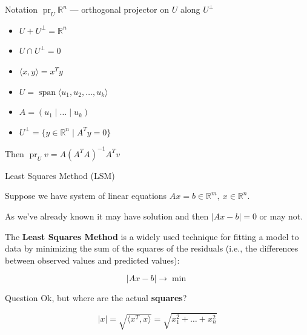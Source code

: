 \documentclass[fullscreen=true, bookmarks=true, hyperref={pdfencoding=unicode}]{beamer}
\begin{document}
\begin{frame}
  \begin{block}{Notation}
    $\operatorname{pr}_U \mathbb{R}^n$ — orthogonal projector 
    on $U$ along $U^\perp$
  \end{block}
  \pause\vspace{0.5cm}
  \begin{itemize}
    \item $U + U^\perp = \mathbb{R}^n$
    \item $U \cap U^\perp = 0$
    \pause
    \item $\langle x, y\rangle = x^T y$
    \item $U = \operatorname{span}\langle u_1, u_2, \dots, u_k\rangle$
    \item $A = (u_1 \mid \dots \mid u_k)$
    \item $U^\perp = \{y \in \mathbb{R}^n \mid A^Ty = 0\}$
  \end{itemize}

  \vspace{0.5cm}
  Then $\operatorname{pr}_U v = A \left(A^TA \right)^{-1}A^Tv$
\end{frame}


\begin{frame}{Least Squares Method (LSM)}

  Suppose we have system of linear equations $Ax=b \in \mathbb{R}^m,\ x \in \mathbb{R}^n$.

  \pause
  As we've already known it may have solution and then $|Ax-b| = 0$ or may not.

  \pause
  The \textbf{Least Squares Method} is a widely used technique 
  for fitting a model to data by minimizing the sum of the squares 
  of the residuals (i.e., the differences between observed values 
  and predicted values):

  $$|Ax-b| \to \min$$

  \pause
  \begin{block}{Question}
    Ok, but where are the actual \textbf{squares}?
  \end{block}

  \pause
  $$|x| = \sqrt{\langle x^T, x\rangle} = \sqrt{x_1^2 + \dots + x_n^2}$$
\end{frame}
\end{document}
